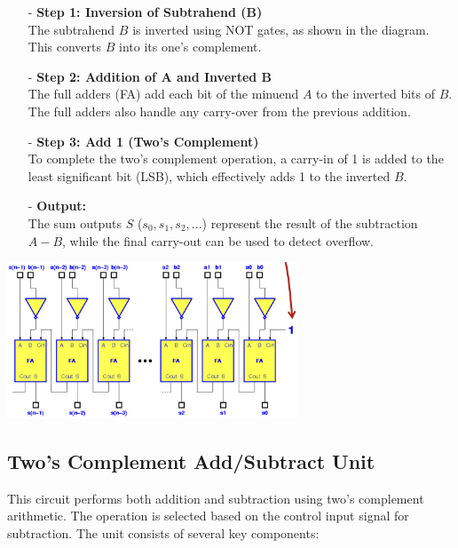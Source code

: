 \begin{itemize}
    \item[-] \textbf{Step 1: Inversion of Subtrahend (B)}\\
    The subtrahend $B$ is inverted using NOT gates, as shown in the diagram. This converts $B$ into its one's complement.
    
    \item[-] \textbf{Step 2: Addition of A and Inverted B}\\
    The full adders (FA) add each bit of the minuend $A$ to the inverted bits of $B$. The full adders also handle any carry-over from the previous addition.

    \item[-] \textbf{Step 3: Add 1 (Two's Complement)}\\
    To complete the two's complement operation, a carry-in of 1 is added to the least significant bit (LSB), which effectively adds 1 to the inverted $B$.

    \item[-] \textbf{Output:}\\
    The sum outputs $S$ ($s_0, s_1, s_2, ...$) represent the result of the subtraction $A - B$, while the final carry-out can be used to detect overflow.
\end{itemize}

\begin{center}
    \includegraphics[width=0.65\textwidth]{chapters/chapter1e/images/substractor.png}
\end{center}

\subsection{Two's Complement Add/Subtract Unit}
This circuit performs both addition and subtraction using two's complement arithmetic. The operation is selected based on the control input signal for subtraction. The unit consists of several key components:

